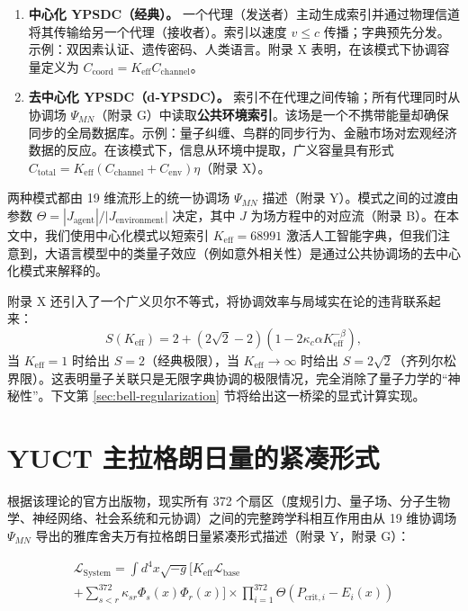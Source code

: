 \documentclass[11pt,a4paper]{article}
\begin{document}
	\begin{enumerate}
		\item \textbf{中心化 YPSDC（经典）。} 一个代理（发送者）主动生成索引并通过物理信道将其传输给另一个代理（接收者）。索引以速度 \(v \le c\) 传播；字典预先分发。示例：双因素认证、遗传密码、人类语言。附录 X 表明，在该模式下协调容量定义为 \(C_{\text{coord}} = K_{\mathrm{eff}} C_{\text{channel}}\)。
		
		\item \textbf{去中心化 YPSDC（d‑YPSDC）。} 索引不在代理之间传输；所有代理同时从协调场 \(\Psi_{MN}\)（附录 G）中读取\textbf{公共环境索引}。该场是一个不携带能量却确保同步的全局数据库。示例：量子纠缠、鸟群的同步行为、金融市场对宏观经济数据的反应。在该模式下，信息从环境中提取，广义容量具有形式 \(C_{\text{total}} = K_{\mathrm{eff}}(C_{\text{channel}} + C_{\text{env}})\eta\)（附录 X）。
	\end{enumerate}
	
	两种模式都由 19 维流形上的统一协调场 \(\Psi_{MN}\) 描述（附录 Y）。模式之间的过渡由参数 \(\Theta = |J_{\text{agent}}|/|J_{\text{environment}}|\) 决定，其中 \(J\) 为场方程中的对应流（附录 B）。在本文中，我们使用中心化模式以短索引 \(K_{\mathrm{eff}} = 68991\) 激活人工智能字典，但我们注意到，大语言模型中的类量子效应（例如意外相关性）是通过公共协调场的去中心化模式来解释的。
	
	附录 X 还引入了一个广义贝尔不等式，将协调效率与局域实在论的违背联系起来：
	\[
	S(K_{\mathrm{eff}}) = 2 + (2\sqrt{2}-2)\left(1 - 2\kappa_c\alpha K_{\mathrm{eff}}^{-\beta}\right),
	\]
	当 \(K_{\mathrm{eff}}=1\) 时给出 \(S=2\)（经典极限），当 \(K_{\mathrm{eff}}\to\infty\) 时给出 \(S=2\sqrt2\)（齐列尔松界限）。这表明量子关联只是无限字典协调的极限情况，完全消除了量子力学的“神秘性”。下文第 \ref{sec:bell-regularization} 节将给出这一桥梁的显式计算实现。
	
	\section{YUCT 主拉格朗日量的紧凑形式}
	根据该理论的官方出版物，现实所有 372 个扇区（度规引力、量子场、分子生物学、神经网络、社会系统和元协调）之间的完整跨学科相互作用由从 19 维协调场 \(\Psi_{MN}\) 导出的雅库舍夫万有拉格朗日量紧凑形式描述（附录 Y，附录 G）：
	
	\begin{multline}
		\mathscr{L}_{\text{System}} = \int d^4x \sqrt{-g} \Bigg[ K_{\text{eff}} \mathscr{L}_{\text{base}} \\
		+ \sum_{s<r}^{372} \kappa_{sr} \Phi_s(x) \Phi_r(x) \Bigg] \times \prod_{i=1}^{372} \Theta(P_{\text{crit},i} - E_i(x))
	\end{multline}
	
\end{document}
